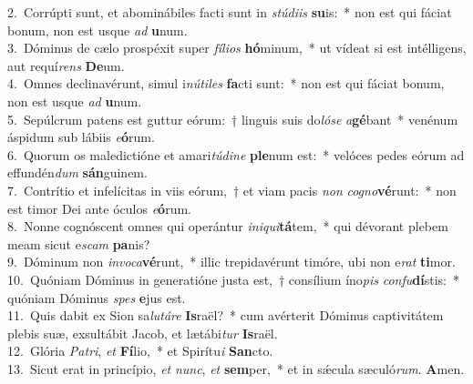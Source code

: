 {2.~}Corrúpti sunt, et abominábiles facti sunt in \textit{stú}\textit{di}\textit{is} \textbf{su}is:~* non est qui fáciat bonum, non est usque \textit{ad} \textbf{u}num.\\
{3.~}Dóminus de cælo prospéxit super \textit{fí}\textit{li}\textit{os} \textbf{hó}minum,~* ut vídeat si est intélligens, aut requí\textit{rens} \textbf{De}um.\\
{4.~}Omnes declinavérunt, simul i\textit{nú}\textit{ti}\textit{les} \textbf{fa}cti sunt:~* non est qui fáciat bonum, non est usque \textit{ad} \textbf{u}num.\\
{5.~}Sepúlcrum patens est guttur eórum:~† linguis suis do\textit{ló}\textit{se} \textit{a}\textbf{gé}bant~* venénum áspidum sub lábiis \textit{e}\textbf{ó}rum.\\
{6.~}Quorum os maledictióne et amari\textit{tú}\textit{di}\textit{ne} \textbf{ple}num est:~* velóces pedes eórum ad effundén\textit{dum} \textbf{sán}guinem.\\
{7.~}Contrítio et infelícitas in viis eórum,~† et viam pacis \textit{non} \textit{co}\textit{gno}\textbf{vé}runt:~* non est timor Dei ante óculos \textit{e}\textbf{ó}rum.\\
{8.~}Nonne cognóscent omnes qui operántur \textit{i}\textit{ni}\textit{qui}\textbf{tá}tem,~* qui dévorant plebem meam sicut e\textit{scam} \textbf{pa}nis?\\
{9.~}Dóminum non \textit{in}\textit{vo}\textit{ca}\textbf{vé}runt,~* illic trepidavérunt timóre, ubi non e\textit{rat} \textbf{ti}mor.\\
{10.~}Quóniam Dóminus in generatióne justa est,~† consílium íno\textit{pis} \textit{con}\textit{fu}\textbf{dí}stis:~* quóniam Dóminus \textit{spes} \textbf{e}jus est.\\
{11.~}Quis dabit ex Sion sa\textit{lu}\textit{tá}\textit{re} \textbf{Is}raël?~* cum avérterit Dóminus captivitátem plebis suæ, exsultábit Jacob, et lætábi\textit{tur} \textbf{Is}raël.\\
{12.~}Glória \textit{Pa}\textit{tri}, \textit{et} \textbf{Fí}lio,~* et Spirítu\textit{i} \textbf{San}cto.\\
{13.~}Sicut erat in princípio, \textit{et} \textit{nunc}, \textit{et} \textbf{sem}per,~* et in sǽcula sæculó\textit{rum}. \textbf{A}men.\\

